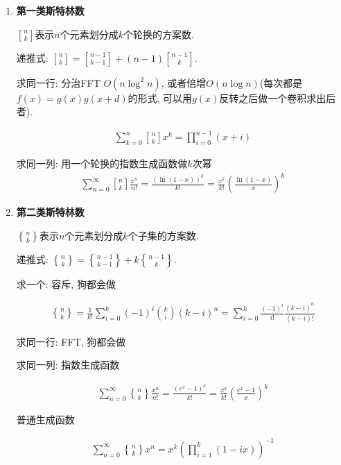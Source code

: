 \begin{enumerate}

    \item \textbf{第一类斯特林数}
    
    $n\brack k$表示$n$个元素划分成$k$个轮换的方案数.
    
    递推式: ${n \brack k} = {n-1 \brack k-1} + (n-1){n-1 \brack k}$.
    
    求同一行: 分治FFT $O(n\log ^2 n)$, 或者倍增$O(n\log n)$(每次都是$f(x) = g(x) g(x + d)$的形式, 可以用$g(x)$反转之后做一个卷积求出后者).
    
    $$ \begin{aligned} \sum_{k = 0} ^ n {n \brack k} x^k = \prod_{i = 0} ^ {n - 1} (x + i) \end{aligned} $$
    
    求同一列: 用一个轮换的指数生成函数做$k$次幂
    $$\begin{aligned} \sum_{n = 0} ^ \infty {n \brack k} \frac {x ^ n} {n!} = \frac {\left(\ln (1 - x)\right) ^ k} {k!} = \frac {x ^ k} {k!} \left( \frac {\ln (1 - x)} x \right) ^ k \end{aligned}$$
    
    \item \textbf{第二类斯特林数}
    
    $n\brace k$表示$n$个元素划分成$k$个子集的方案数.
    
    递推式: ${n \brace k} = {n-1 \brace k-1} + k{n-1 \brace k}$.
    
    求一个: 容斥, 狗都会做
    
    $$\begin{aligned} {n \brace k} = \frac 1 {k!} \sum_{i = 0} ^ k (-1) ^ i {k \choose i} (k - i) ^ n = \sum_{i = 0} ^ k \frac {(-1) ^ i} {i!} \frac {(k - i) ^ n} {(k - i)!} \end{aligned}$$
    
    求同一行: FFT, 狗都会做
    
    求同一列: 指数生成函数
    
    $$\begin{aligned} \sum_{n = 0} ^ \infty {n \brace k} \frac {x ^ n} {n!} = \frac {\left(e ^ x - 1\right) ^ k} {k!} = \frac {x ^ k} {k!} \left( \frac {e ^ x - 1} x \right) ^ k \end{aligned}$$
    
    普通生成函数
    
    $$\begin{aligned} \sum_{n = 0} ^ \infty {n \brace k} x ^ n = x ^ k \left(\prod_{i = 1} ^ k (1 - i x)\right) ^ {-1} \end{aligned}$$
    

\end{enumerate}

